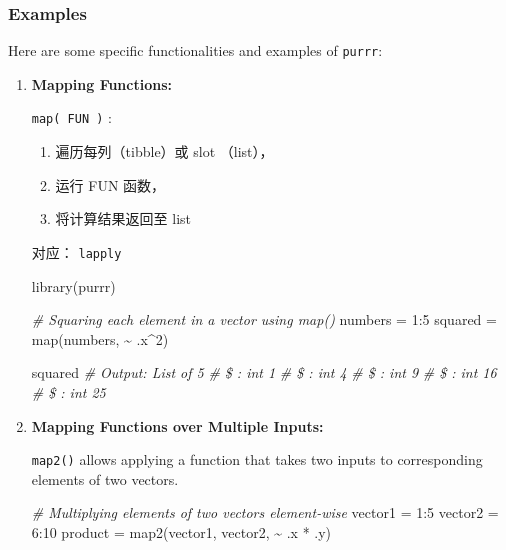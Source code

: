 \documentclass[
]{article}
\newenvironment{Shaded}{}{}
\newcommand{\CommentTok}[1]{\textcolor[rgb]{0.38,0.63,0.69}{\textit{#1}}}
\newcommand{\DecValTok}[1]{\textcolor[rgb]{0.25,0.63,0.44}{#1}}
\newcommand{\FunctionTok}[1]{\textcolor[rgb]{0.02,0.16,0.49}{#1}}
\newcommand{\NormalTok}[1]{#1}
\newcommand{\OtherTok}[1]{\textcolor[rgb]{0.00,0.44,0.13}{#1}}
\newcommand{\SpecialCharTok}[1]{\textcolor[rgb]{0.25,0.44,0.63}{#1}}
\begin{document}
\hypertarget{examples}{%
\subsubsection{Examples}\label{examples}}

Here are some specific functionalities and examples of \texttt{purrr}:

\begin{enumerate}
\def\labelenumi{\arabic{enumi}.}
\item
  \textbf{Mapping Functions:}

  \texttt{map(\ FUN\ )} :

  \begin{enumerate}
  \def\labelenumii{\arabic{enumii}.}
  \item
    遍历每列（tibble）或 slot （list），
  \item
    运行 FUN 函数，
  \item
    将计算结果返回至 list
  \end{enumerate}

  对应： \texttt{lapply}

\begin{Shaded}
\begin{Highlighting}[]
 \FunctionTok{library}\NormalTok{(purrr)}

 \CommentTok{\# Squaring each element in a vector using map()}
\NormalTok{ numbers }\OtherTok{=} \DecValTok{1}\SpecialCharTok{:}\DecValTok{5}
\NormalTok{ squared }\OtherTok{=} \FunctionTok{map}\NormalTok{(numbers, }\SpecialCharTok{\textasciitilde{}}\NormalTok{ .x}\SpecialCharTok{\^{}}\DecValTok{2}\NormalTok{)}

\NormalTok{ squared}
 \CommentTok{\# Output: List of 5}
 \CommentTok{\# \$ : int 1}
 \CommentTok{\# \$ : int 4}
 \CommentTok{\# \$ : int 9}
 \CommentTok{\# \$ : int 16}
 \CommentTok{\# \$ : int 25}
\end{Highlighting}
\end{Shaded}
\item
  \textbf{Mapping Functions over Multiple Inputs:}

  \texttt{map2()} allows applying a function that takes two inputs to
  corresponding elements of two vectors.

\begin{Shaded}
\begin{Highlighting}[]
 \CommentTok{\# Multiplying elements of two vectors element{-}wise}
\NormalTok{ vector1 }\OtherTok{=} \DecValTok{1}\SpecialCharTok{:}\DecValTok{5}
\NormalTok{ vector2 }\OtherTok{=} \DecValTok{6}\SpecialCharTok{:}\DecValTok{10}
\NormalTok{ product }\OtherTok{=} \FunctionTok{map2}\NormalTok{(vector1, vector2, }\SpecialCharTok{\textasciitilde{}}\NormalTok{ .x }\SpecialCharTok{*}\NormalTok{ .y)}


\end{Highlighting}
\end{Shaded}
\end{enumerate}
\end{document}
